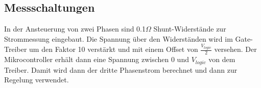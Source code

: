 \subsection*{Messschaltungen}
In der Ansteuerung von zwei Phasen sind 0.1\(\Omega\) Shunt-Widerstände zur Strommessung eingebaut. Die Spannung über den Widerständen wird im Gate-Treiber um den Faktor 10 verstärkt und mit einem Offset von $\frac{V_{logic}}{2}$ versehen. Der Mikrocontroller erhält dann eine Spannung zwischen 0 und $V_{logic}$ von dem Treiber. Damit wird dann der dritte Phasenstrom berechnet und dann zur Regelung verwendet.
